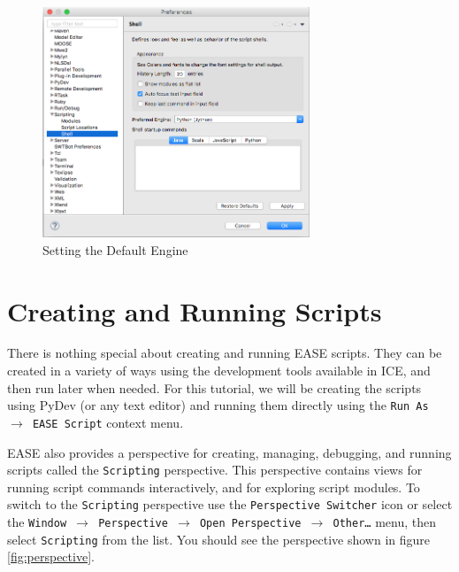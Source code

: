 \begin{figure}[!ht]
\centering
\includegraphics[width=8cm]{images/scripting-prefs2}
\caption{Setting the Default Engine}
\label{fig:prefs2}
\end{figure}

\section{Creating and Running Scripts}

There is nothing special about creating and running EASE scripts. They can be
created in a variety of ways using the development tools available in ICE, and
then run later when needed. For this tutorial, we will be creating the scripts
using PyDev (or any text editor) and running them directly using the \texttt{Run As
$\rightarrow$ EASE Script} context menu.

EASE also provides a perspective for creating, managing, debugging, and running
scripts called the \texttt{Scripting} perspective. This perspective contains
views for running script commands interactively, and for exploring script modules.
To switch to the \texttt{Scripting} perspective use the \texttt{Perspective
Switcher} icon or select the \texttt{Window $\rightarrow$ Perspective
$\rightarrow$ Open Perspective $\rightarrow$ Other\ldots} menu, then select 
\texttt{Scripting} from the list. You should see the perspective shown in figure
\ref{fig:perspective}.

